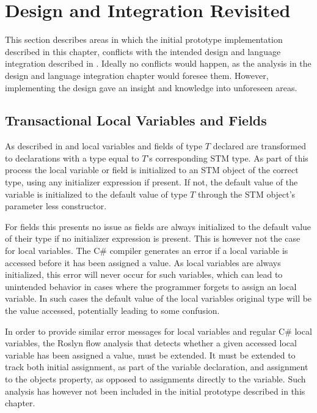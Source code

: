 
\section{Design and Integration Revisited}
This section describes areas in which the initial prototype implementation described in this chapter, conflicts with the intended design and language integration described in . Ideally no conflicts would happen, as the analysis in the design and language integration chapter would foresee them. However, implementing the design gave an insight and knowledge into unforeseen areas.

\subsection{Transactional Local Variables and Fields}
As described in  and  local variables and fields of type $T$ declared  are transformed to declarations with a type equal to $T$'s corresponding \ac{STM} type. As part of this process the local variable or field is initialized to an \ac{STM} object of the correct type, using any initializer expression if present. If not, the default value of the variable is initialized to the default value of type $T$ through the \ac{STM} object's parameter less constructor. 

For fields this presents no issue as fields are always initialized to the default value of their type if no initializer expression is present\cite[p. 93]{csharp2013specificaiton}. This is however not the case for local variables. The C\# compiler generates an error if a local variable is accessed before it has been assigned a value\cite[p. 96]{csharp2013specificaiton}. As  local variables are always initialized, this error will never occur for such variables, which can lead to unintended behavior in cases where the programmer forgets to assign an  local variable. In such cases the default value of the  local variables original type will be the value accessed, potentially leading to some confusion.

In order to provide similar error messages for  local variables and regular C\# local variables, the Roslyn flow analysis that detects whether a given accessed local variable has been assigned a value, must be extended. It must be extended to track both initial assignment, as part of the variable declaration, and assignment to the  objects  property, as opposed to assignments directly to the variable. Such analysis has however not been included in the initial prototype described in this chapter.

